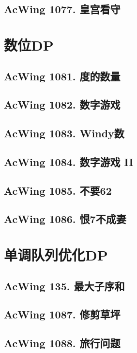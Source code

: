 \subsection{AcWing 1077. 皇宫看守}


\section{数位DP}

\subsection{AcWing 1081. 度的数量}

\subsection{AcWing 1082. 数字游戏}

\subsection{AcWing 1083. Windy数}

\subsection{AcWing 1084. 数字游戏 II}

\subsection{AcWing 1085. 不要62}

\subsection{AcWing 1086. 恨7不成妻}


\section{单调队列优化DP}

\subsection{AcWing 135. 最大子序和}

\subsection{AcWing 1087. 修剪草坪}

\subsection{AcWing 1088. 旅行问题}

